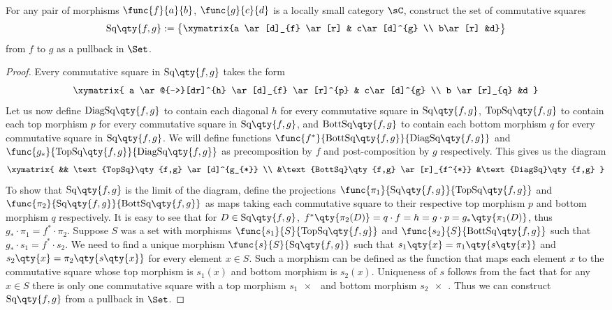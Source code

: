 \documentclass[../../main]{subfiles}
\begin{document}
\paragraph{}
\begin{exercise}
	For any pair of morphisms $\func{f}{a}{b}$, $\func{g}{c}{d}$ is a locally
	small category $\sC$, construct the set of commutative squares
	$$\text{Sq}\qty{f,g} :=  \left\{\begin{gathered}\xymatrix{a \ar[d]_{f}
	\ar[r] & c\ar[d]^{g}  \\ b\ar[r] &d}\end{gathered}\right\}  $$ from $f$ to
	$g$ as a pullback in $\Set$.
\end{exercise}

\begin{proof}
	Every commutative square in $\text{Sq}\qty{f,g}$ takes the form
	$$\xymatrix{ a \ar@{-->}[dr]^{h} \ar[d]_{f} \ar[r]^{p} & c\ar[d]^{g} \\
	b \ar[r]_{q} &d  } $$
	Let us now define
	$\text{DiagSq}\qty{f,g}$ to contain each diagonal $h$ for every
	commutative square in $\text{Sq}\qty{f,g}$,
	$\text{TopSq}\qty{f,g}$ to contain each top morphism $p$ for
	every commutative square in $\text{Sq}\qty{f,g}$, and
	$\text{BottSq}\qty{f,g}$ to contain each bottom morphism $q$
	for every commutative square in $\text{Sq}\qty{f,g}$. We will
	define functions
	$\func{f^{*}}{\text{BottSq}\qty{f,g}}{\text{DiagSq}\qty{f,g}}$
	and
	$\func{g_{*}}{\text{TopSq}\qty{f,g}}{\text{DiagSq}\qty{f,g}}$
	as precomposition by $f$ and post-composition by $g$
	respectively. This gives us the diagram $$\xymatrix{  &&
		\text{TopSq}\qty{f,g} \ar[d]^{g_{*}}  \\
		&\text{BottSq}\qty{f,g}
	\ar[r]_{f^{*}} &\text{DiagSq}\qty{f,g}  } $$ To show that
	$\text{Sq}\qty{f,g}$ is the limit of the diagram, define the
	projections
	$\func{\pi_{1}}{\text{Sq}\qty{f,g}}{\text{TopSq}\qty{f,g}}$ and
	$\func{\pi_{2}}{\text{Sq}\qty{f,g}}{\text{BottSq}\qty{f,g}}$ as
	maps taking each commutative square to their respective top
	morphism $p$ and bottom morphism $q$ respectively. It is easy
	to see that for $D \in \text{Sq}\qty{f,g}$,
	$f^{*}\qty{\pi_{2}(D)} = q \cdot f = h = g \cdot p =
	g_{*}\qty{\pi_{1}(D)}$, thus $g_{*} \cdot \pi_{1} =  f^{*}
	\cdot \pi_{2}$. Suppose $S$ was a set with morphisms
	$\func{s_{1}}{S}{\text{TopSq}\qty{f,g}}$ and
	$\func{s_{2}}{S}{\text{BottSq}\qty{f,g}}$ such that $g_{*}
	\cdot s_{1} =  f^{*} \cdot s_{2}$. We need to find a unique
	morphism  $\func{s}{S}{\text{Sq}\qty{f,g}}$ such that
	$s_{1}\qty{x} = \pi_{1}\qty{s\qty{x}}$ and $s_{2}\qty{x} =
	\pi_{2}\qty{s\qty{x}}$ for every element $x \in S$. Such a
	morphism can be defined as the function that maps each element
	$x$ to the commutative square whose top morphism is $s_{1}(x)$
	and bottom morphism is $s_{2}(x)$. Uniqueness of $s$ follows
	from the fact that for any $x \in S$ there is only one
	commutative square with a top morphism $s_{1}\qty{x}$ and
	bottom morphism $s_{2}\qty{x}$. Thus we can construct
	$\text{Sq}\qty{f,g}$ from a pullback in $\Set$.

\end{proof}
\end{document}
